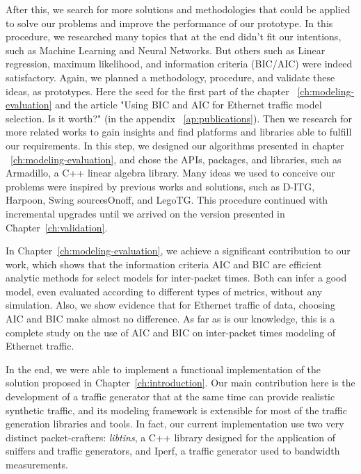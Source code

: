 After this, we search for more solutions and methodologies that could be applied to solve our problems and improve the performance of our prototype. In this procedure, we researched many topics that at the end didn't fit our intentions, such as Machine Learning and Neural Networks. But others such as Linear regression, maximum likelihood, and information criteria (BIC/AIC) were indeed satisfactory. Again, we planned a methodology, procedure, and validate these ideas, as prototypes. Here the seed for the first part of the chapter ~\ref{ch:modeling-evaluation} and the article "Using BIC and AIC for Ethernet traffic model selection. Is it worth?" (in the appendix ~\ref{ap:publications}). Then we research for more related works to gain insights and find platforms and libraries able to fulfill our requirements. In this step, we designed our algorithms presented in chapter ~\ref{ch:modeling-evaluation}, and chose the APIs, packages, and libraries, such as Armadillo\cite{armadillo}, a C++ linear algebra library. Many ideas we used to conceive our problems were inspired by previous works and solutions, such as D-ITG\cite{ditg-paper}, Harpoon\cite{harpoon-validation}, Swing\cite{swing-paper} sourcesOnoff\cite{sourcesonoff-paper}, and LegoTG\cite{legotg-paper}. This procedure continued with incremental upgrades until we arrived on the version presented in Chapter~\ref{ch:validation}. 


In Chapter~\ref{ch:modeling-evaluation}, we achieve a significant contribution to our work, which shows that the information criteria AIC and BIC are efficient analytic methods for select models for inter-packet times. Both can infer a good model, even evaluated according to different types of metrics, without any simulation. Also, we show evidence that for Ethernet traffic of data, choosing AIC and BIC make almost no difference. As far as is our knowledge, this is a complete study on the use of AIC and BIC on inter-packet times modeling of Ethernet traffic.


In the end, we were able to implement a functional implementation of the solution proposed in Chapter~\ref{ch:introduction}. Our main contribution here is the development of a traffic generator that at the same time can provide realistic synthetic traffic, and its modeling framework is extensible for most of the traffic generation libraries and tools. In fact, our current implementation use two very distinct packet-crafters: \textit{libtins}, a C++ library designed for the application of sniffers and traffic generators, and Iperf, a traffic generator used to  bandwidth measurements. 


